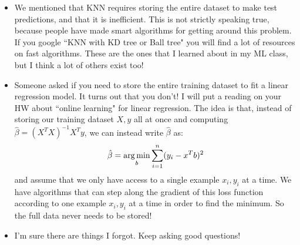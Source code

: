 \begin{itemize}
\begin{itemize}
\begin{itemize}
\end{itemize}
\end{itemize}
\item We mentioned that KNN requires storing the entire dataset to make test predictions, and that it is inefficient. This is not strictly speaking true, because people have made smart algorithms for getting around this problem.
If you google ``KNN with KD tree or Ball tree" you will find a lot of resources on fast algorithms. These are the ones that I learned about in my ML class, but I think a lot of others exist too!
\item Someone asked if you need to store the entire training dataset to fit a linear regression model. It turns out that you don't! I will put a reading on your HW about ``online learning" for linear regression. The idea is that, instead of storing our training dataset $X,y$ all at once and computing $\hat{\beta} = (X^T X)^{-1} X^T y$, we can instead write $\hat{\beta}$ as:
$$
\hat{\beta} = \mathop{\mathrm{arg\,min}}_b \sum_{i=1}^n (y_i - x^T b)^2
$$
and assume that we only have access to a single example $x_i, y_i$ at a time. We have algorithms that can step along the gradient of this loss function according to one example $x_i, y_i$ at a time in order to find the minimum. So the full data never needs to be stored! 
\item I'm sure there are things I forgot. Keep asking good questions!
\end{itemize}


















